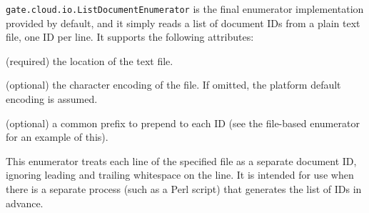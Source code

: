 \verb!gate.cloud.io.ListDocumentEnumerator! is the final enumerator
implementation provided by default, and it simply reads a list of document IDs
from a plain text file, one ID per line.  It supports the following attributes:

\bde
\item[file] (required) the location of the text file.
\item[encoding] (optional) the character encoding of the file.  If omitted, the
  platform default encoding is assumed.
\item[prefix] (optional) a common prefix to prepend to each ID (see the
  file-based enumerator for an example of this).
\ede

This enumerator treats each line of the specified file as a separate document
ID, ignoring leading and trailing whitespace on the line.  It is intended for
use when there is a separate process (such as a Perl script) that generates the
list of IDs in advance.


